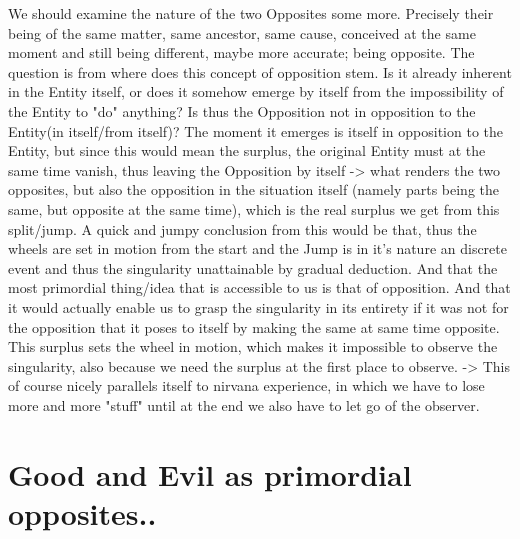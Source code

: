 \documentclass[10pt]{book}
\begin{document}
We should examine the nature of the two Opposites some more. Precisely their being of the same matter, same ancestor, same cause, conceived at the same moment and still being different, maybe more accurate; being opposite. The question is from where does this concept of opposition stem. Is it already inherent in the Entity itself, or does it somehow emerge by itself from the impossibility of the Entity to "do" anything? Is thus the Opposition not in opposition to the Entity(in itself/from itself)? The moment it emerges is itself in opposition to the Entity, but since this would mean the surplus, the original Entity must at the same time vanish, thus leaving the Opposition by itself -> what renders the two opposites, but also the opposition in the situation itself (namely parts being the same, but opposite at the same time), which is the real surplus we get from this split/jump. 
A quick and jumpy conclusion from this would be that, thus the wheels are set in motion from the start and the Jump is in it's nature an discrete event and thus the singularity unattainable by gradual deduction. And that the most primordial thing/idea that is accessible to us is that of opposition. And that it would actually enable us to grasp the singularity in its entirety if it was not for the opposition that it poses to itself by making the same at same time opposite. This surplus sets the wheel in motion, which makes it impossible to observe the singularity, also because we need the surplus at the first place to observe. -> This of course nicely parallels itself to nirvana experience, in which we have to lose more and more "stuff" until at the end we also have to let go of the observer.

\section{Good and Evil as primordial opposites..}
\end{document}
